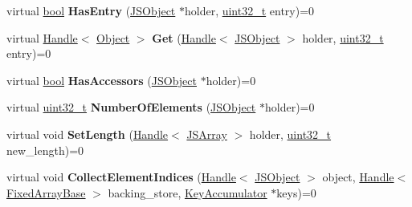 \begin{DoxyCompactItemize}
\item 
\mbox{\label{classv8_1_1internal_1_1ElementsAccessor_ae0a557b9596eb6607d606988967dcf3f}} 
virtual \mbox{\hyperlink{classbool}{bool}} {\bfseries Has\+Entry} (\mbox{\hyperlink{classv8_1_1internal_1_1JSObject}{J\+S\+Object}} $\ast$holder, \mbox{\hyperlink{classuint32__t}{uint32\+\_\+t}} entry)=0
\item 
\mbox{\label{classv8_1_1internal_1_1ElementsAccessor_a4941141f96048d565af369dc674b1916}} 
virtual \mbox{\hyperlink{classv8_1_1internal_1_1Handle}{Handle}}$<$ \mbox{\hyperlink{classv8_1_1internal_1_1Object}{Object}} $>$ {\bfseries Get} (\mbox{\hyperlink{classv8_1_1internal_1_1Handle}{Handle}}$<$ \mbox{\hyperlink{classv8_1_1internal_1_1JSObject}{J\+S\+Object}} $>$ holder, \mbox{\hyperlink{classuint32__t}{uint32\+\_\+t}} entry)=0
\item 
\mbox{\label{classv8_1_1internal_1_1ElementsAccessor_ae12bc20cb4f11a7b844f6fd9bdee4879}} 
virtual \mbox{\hyperlink{classbool}{bool}} {\bfseries Has\+Accessors} (\mbox{\hyperlink{classv8_1_1internal_1_1JSObject}{J\+S\+Object}} $\ast$holder)=0
\item 
\mbox{\label{classv8_1_1internal_1_1ElementsAccessor_af4ceec146e46276f47d829602aa10b88}} 
virtual \mbox{\hyperlink{classuint32__t}{uint32\+\_\+t}} {\bfseries Number\+Of\+Elements} (\mbox{\hyperlink{classv8_1_1internal_1_1JSObject}{J\+S\+Object}} $\ast$holder)=0
\item 
\mbox{\label{classv8_1_1internal_1_1ElementsAccessor_a8d1b3c1a8895fd7969476d6ea5a6900a}} 
virtual void {\bfseries Set\+Length} (\mbox{\hyperlink{classv8_1_1internal_1_1Handle}{Handle}}$<$ \mbox{\hyperlink{classv8_1_1internal_1_1JSArray}{J\+S\+Array}} $>$ holder, \mbox{\hyperlink{classuint32__t}{uint32\+\_\+t}} new\+\_\+length)=0
\item 
\mbox{\label{classv8_1_1internal_1_1ElementsAccessor_a460b363fe6001150933eb6600afce21f}} 
virtual void {\bfseries Collect\+Element\+Indices} (\mbox{\hyperlink{classv8_1_1internal_1_1Handle}{Handle}}$<$ \mbox{\hyperlink{classv8_1_1internal_1_1JSObject}{J\+S\+Object}} $>$ object, \mbox{\hyperlink{classv8_1_1internal_1_1Handle}{Handle}}$<$ \mbox{\hyperlink{classv8_1_1internal_1_1FixedArrayBase}{Fixed\+Array\+Base}} $>$ backing\+\_\+store, \mbox{\hyperlink{classv8_1_1internal_1_1KeyAccumulator}{Key\+Accumulator}} $\ast$keys)=0

\end{DoxyCompactItemize}
